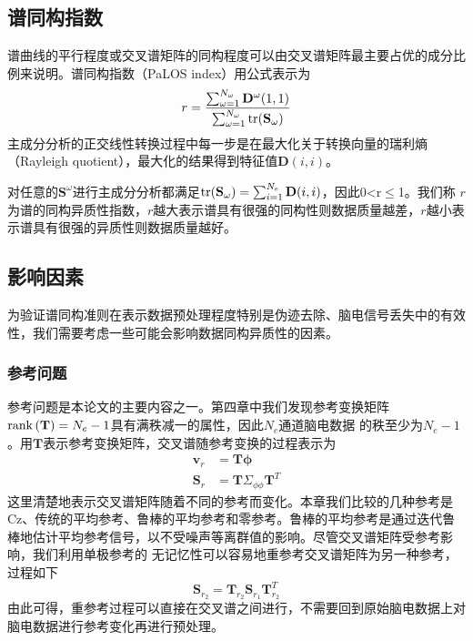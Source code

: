 \subsection{谱同构指数}
谱曲线的平行程度或交叉谱矩阵的同构程度可以由交叉谱矩阵最主要占优的成分比例来说明。谱同构指数（PaLOS index）用公式表示为
\begin{equation}\label{eq5.5}
r=\frac{\sum_{\omega=1}^{N_\omega}\mathbf{D}^\omega(1,1)}{\sum_{\omega=1}^{N_\omega}\operatorname{tr}(\mathbf{S}_\omega)}
\end{equation}
主成分分析的正交线性转换过程中每一步是在最大化关于转换向量的瑞利熵（Rayleigh quotient），最大化的结果得到特征值$\mathbf{D}(i,i)$。

对任意的$\mathbf{S}^\omega$进行主成分分析都满足$\operatorname{tr}(\mathbf{S}_\omega)=\sum_{i=1}^{N_e}\mathbf{D}(i,i)$，因此0<r$\leq$1。我们称
$r$为谱的同构异质性指数，$r$越大表示谱具有很强的同构性则数据质量越差，$r$越小表示谱具有很强的异质性则数据质量越好。

\subsection{影响因素}
为验证谱同构准则在表示数据预处理程度特别是伪迹去除、脑电信号丢失中的有效性，我们需要考虑一些可能会影响数据同构异质性的因素。
\subsubsection{参考问题}
参考问题是本论文的主要内容之一。第四章中我们发现参考变换矩阵$\operatorname{rank}{(\mathbf{T})}=N_e-1$具有满秩减一的属性，因此$N_e$通道脑电数据
的秩至少为$N_e-1$。用$\mathbf{T}$表示参考变换矩阵，交叉谱随参考变换的过程表示为
\begin{equation}\label{eq5.6}
\begin{aligned}
\mathbf{v}_r& =\mathbf{T\phi}\\
\mathbf{S}_r& =\mathbf{T}\Sigma_{\phi\phi}\mathbf{T}^T
\end{aligned}
\end{equation}
这里清楚地表示交叉谱矩阵随着不同的参考而变化。本章我们比较的几种参考是Cz、传统的平均参考、鲁棒的平均参考和零参考。鲁棒的平均参考是通过迭代鲁棒地估计平均参考信号，以不受噪声等离群值的影响。尽管交叉谱矩阵受参考影响，我们利用单极参考的
无记忆性可以容易地重参考交叉谱矩阵为另一种参考，过程如下
\begin{equation}\label{eq5.7}
\mathbf{S}_{r_2}=\mathbf{T}_{r_2}\mathbf{S}_{r_1}\mathbf{T}_{r_2}^T
\end{equation}
由此可得，重参考过程可以直接在交叉谱之间进行，不需要回到原始脑电数据上对脑电数据进行参考变化再进行预处理。


